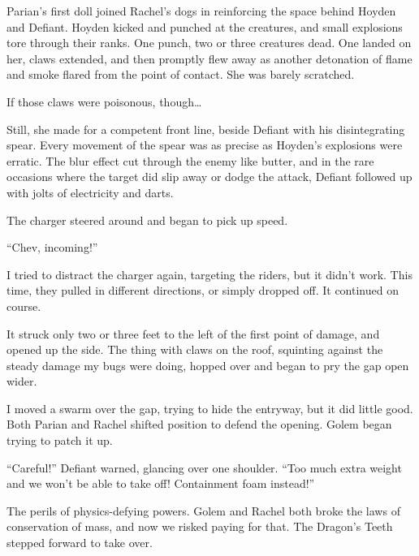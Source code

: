 Parian's first doll joined Rachel's dogs in reinforcing the space behind Hoyden and Defiant.  Hoyden kicked and punched at the creatures, and small explosions tore through their ranks.  One punch, two or three creatures dead.  One landed on her, claws extended, and then promptly flew away as another detonation of flame and smoke flared from the point of contact.  She was barely scratched.



If those claws were poisonous, though\ldots



Still, she made for a competent front line, beside Defiant with his disintegrating spear.  Every movement of the spear was as precise as Hoyden's explosions were erratic.  The blur effect cut through the enemy like butter, and in the rare occasions where the target did slip away or dodge the attack, Defiant followed up with jolts of electricity and darts.



The charger steered around and began to pick up speed.



``Chev, incoming!''



I tried to distract the charger again, targeting the riders, but it didn't work.  This time, they pulled in different directions, or simply dropped off.  It continued on course.



It struck only two or three feet to the left of the first point of damage, and opened up the side.  The thing with claws on the roof, squinting against the steady damage my bugs were doing, hopped over and began to pry the gap open wider.



I moved a swarm over the gap, trying to hide the entryway, but it did little good.  Both Parian and Rachel shifted position to defend the opening.  Golem began trying to patch it up.



``Careful!'' Defiant warned, glancing over one shoulder.  ``Too much extra weight and we won't be able to take off!  Containment foam instead!''



The perils of physics-defying powers.  Golem and Rachel both broke the laws of conservation of mass, and now we risked paying for that.  The Dragon's Teeth stepped forward to take over.



